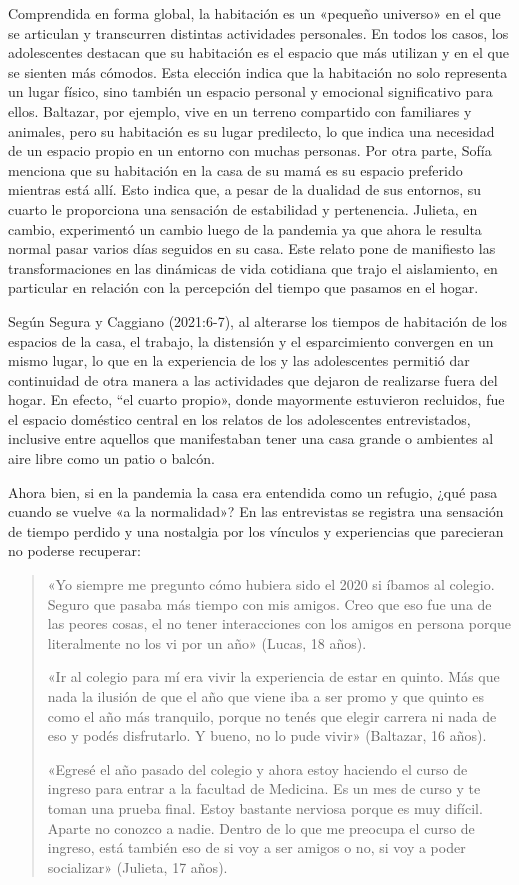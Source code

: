 Comprendida en forma global, la habitación es un «pequeño universo» en el que se articulan y transcurren distintas actividades personales. En todos los casos, los adolescentes destacan que su habitación es el espacio que más utilizan y en el que se sienten más cómodos. Esta elección indica que la habitación no solo representa un lugar físico, sino también un espacio personal y emocional significativo para ellos. Baltazar, por ejemplo, vive en un terreno compartido con familiares y animales, pero su habitación es su lugar predilecto, lo que indica una necesidad de un espacio propio en un entorno con muchas personas. Por otra parte, Sofía menciona que su habitación en la casa de su mamá es su espacio preferido mientras está allí. Esto indica que, a pesar de la dualidad de sus entornos, su cuarto le proporciona una sensación de estabilidad y pertenencia. Julieta, en cambio, experimentó un cambio luego de la pandemia ya que ahora le resulta normal pasar varios días seguidos en su casa. Este relato pone de manifiesto las transformaciones en las dinámicas de vida cotidiana que trajo el aislamiento, en particular en relación con la percepción del tiempo que pasamos en el hogar.

Según Segura y Caggiano (2021:6-7), al alterarse los tiempos de habitación de los espacios de la casa, el trabajo, la distensión y el esparcimiento convergen en un mismo lugar, lo que en la experiencia de los y las adolescentes permitió dar continuidad de otra manera a las actividades que dejaron de realizarse fuera del hogar. En efecto, ``el cuarto propio», donde mayormente estuvieron recluidos, fue el espacio doméstico central en los relatos de los adolescentes entrevistados, inclusive entre aquellos que manifestaban tener una casa grande o ambientes al aire libre como un patio o balcón.

Ahora bien, si en la pandemia la casa era entendida como un refugio, ¿qué pasa cuando se vuelve «a la normalidad»? En las entrevistas se registra una sensación de tiempo perdido y una nostalgia por los vínculos y experiencias que parecieran no poderse recuperar:

\begin{quote}
«Yo siempre me pregunto cómo hubiera sido el 2020 si íbamos al colegio. Seguro que pasaba más tiempo con mis amigos. Creo que eso fue una de las peores cosas, el no tener interacciones con los amigos en persona porque literalmente no los vi por un año» (Lucas, 18 años).

«Ir al colegio para mí era vivir la experiencia de estar en quinto. Más que nada la ilusión de que el año que viene iba a ser promo y que quinto es como el año más tranquilo, porque no tenés que elegir carrera ni nada de eso y podés disfrutarlo. Y bueno, no lo pude vivir» (Baltazar, 16 años).

«Egresé el año pasado del colegio y ahora estoy haciendo el curso de ingreso para entrar a la facultad de Medicina. Es un mes de curso y te toman una prueba final. Estoy bastante nerviosa porque es muy difícil. Aparte no conozco a nadie. Dentro de lo que me preocupa el curso de ingreso, está también eso de si voy a ser amigos o no, si voy a poder socializar» (Julieta, 17 años).
\end{quote}

